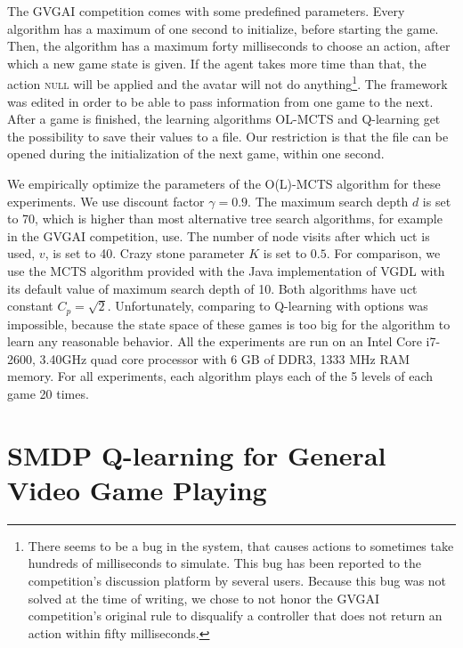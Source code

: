 The GVGAI competition comes with some predefined parameters. Every algorithm has
a maximum of one second to initialize, before starting the game. Then, the
algorithm has a maximum forty milliseconds to choose an action, after which a
new game state is given. If the agent takes more time than that, the action
\textsc{null} will be applied and the avatar will not do anything\footnote{There
seems to be a bug in the system, that causes actions to sometimes take hundreds
of milliseconds to simulate. This bug has been reported to the competition's
discussion platform by several users. Because this bug was not solved at the
time of writing, we chose to not honor the GVGAI competition's original rule to
disqualify a controller that does not return an action within fifty
milliseconds.}. The framework was edited in order to be able to pass information
from one game to the next. After a game is finished, the learning algorithms
OL-MCTS and Q-learning get the possibility to save their values to a file. Our
restriction is that the file can be opened during the initialization of the next
game, within one second. 

We empirically optimize the parameters of the O(L)-MCTS algorithm for these
experiments. We use discount factor $\gamma = 0.9$. The maximum search depth $d$
is set to 70, which is higher than most alternative tree search algorithms, for
example in the GVGAI competition, use. The number of node visits after which
\textsf{uct} is used, $v$, is set to 40. Crazy stone parameter $K$ is set to
$0.5$.  For comparison, we use the MCTS algorithm provided with the Java
implementation of VGDL with its default value of maximum search depth of 10.
Both algorithms have \textsf{uct} constant $C_p = \sqrt{2}$. Unfortunately,
comparing to Q-learning with options was impossible, because the state space of
these games is too big for the algorithm to learn any reasonable behavior. All
the experiments are run on an Intel %
Core %
i7-2600, 3.40GHz quad core processor with 6 GB of DDR3, 1333 MHz RAM memory. For
all experiments, each algorithm plays each of the 5 levels of each game 20
times. 

\section{SMDP Q-learning for General Video Game Playing}
